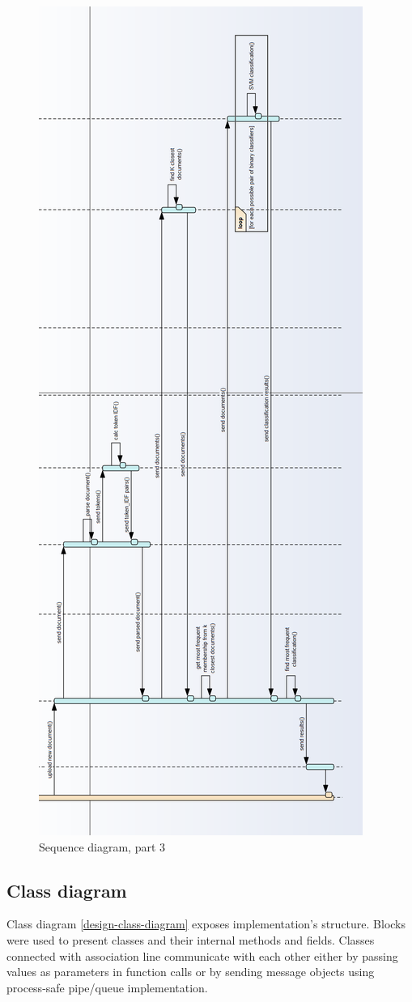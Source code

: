 \begin{figure}[H]
	\begin{center}
		\includegraphics[width=0.6\linewidth]{images/diagrams/seq3-h.png}
		\caption{Sequence diagram, part 3}
		\label{design-sequence-diagram-3}
	\end{center}
\end{figure}

\subsection{Class diagram}
Class diagram \ref{design-class-diagram} exposes implementation's structure. Blocks were used to present classes and their internal methods and fields. Classes connected with association line communicate with each other either by passing values as parameters in function calls or by sending message objects using process-safe pipe/queue implementation. 


